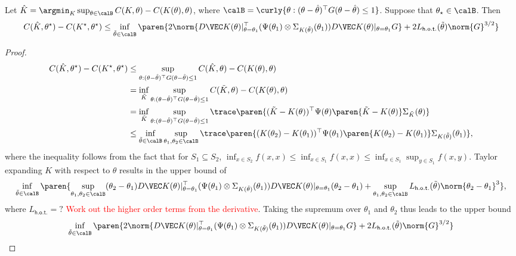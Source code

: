 \begin{lemma}
    Let $\hat K = \argmin_K \sup_{\theta\in\calB} C(K,  \theta) - C(K(\theta), \theta)$, where $\calB = \curly{\theta: (\theta - \hat\theta)^\top G (\theta - \hat \theta) \leq 1}$.  Suppose that $\theta_\star \in \calB$. Then
    \begin{align*}
        C(\hat K, \theta^\star) - C(K^\star, \theta^\star) \leq \inf_{\tilde \theta \in \calB} \paren{ 2 \norm{D \VEC K(\theta)\vert_{\theta= \theta_1}^\top (\Psi(\theta_1) \otimes \Sigma_{K(\tilde \theta)}(\theta_1)) D \VEC K(\theta)\vert_{\theta= \theta_1} G} + 2 L_{\mathsf{h.o.t.}}(\tilde \theta) \norm{G}^{3/2}}
    \end{align*}
\end{lemma}
\begin{proof}
    \begin{align*}
        C(\hat K, \theta^\star) - C(K^\star, \theta^\star)  &\leq \sup_{\theta: (\theta - \hat \theta)^\top G (\theta - \hat\theta) \leq 1} C(\hat K, \theta) - C(K(\theta), \theta) \\
        & = \inf_{\tilde K} \sup_{\theta: (\theta - \hat \theta)^\top G (\theta - \hat\theta) \leq 1} C(\tilde K, \theta) - C(K(\theta), \theta) \\
        &= \inf_{\tilde K} \sup_{\theta: (\theta - \hat \theta)^\top G (\theta - \hat\theta) \leq 1} \trace\paren{(\tilde K - K(\theta))^\top \Psi(\theta) \paren{\tilde K - K(\theta)} \Sigma_{\tilde K}(\theta)} \\
        &\leq \inf_{\tilde \theta \in \calB} \sup_{\theta_1, \theta_2\in\calB} \trace\paren{(K(\theta_2) - K(\theta_1))^\top \Psi(\theta_1) \paren{K(\theta_2) - K(\theta_1)} \Sigma_{K(\tilde \theta)}(\theta_1)},
    \end{align*}
    where the inequality follows from the fact that for $S_1 \subseteq S_2$, $\inf_{x \in S_2} f(x,x) \leq \inf_{x \in S_1} f(x,x) \leq \inf_{x \in S_1} \sup_{y\in S_1} f(x,y)$. Taylor expanding $K$ with respect to $\theta$ results in the upper bound of 
    \begin{align*}
        \inf_{\tilde \theta \in \calB} \paren{\sup_{\theta_1, \theta_2\in\calB} (\theta_2 - \theta_1) D \VEC K(\theta)\vert_{\theta= \theta_1}^\top (\Psi(\theta_1) \otimes \Sigma_{K(\tilde \theta)}(\theta_1)) D \VEC K(\theta)\vert_{\theta= \theta_1} (\theta_2 - \theta_1) + \sup_{\theta_1, \theta_2\in\calB}  L_{\mathsf{h.o.t.}} (\tilde \theta) \norm{\theta_2 - \theta_1}^3},
    \end{align*}
    where $L_{\mathsf{h.o.t.}} = ?$ \textcolor{red}{Work out the higher order terms from the derivative}. Taking the supremum over $\theta_1$ and $\theta_2$ thus leads to the upper bound
    \begin{align*}
         \inf_{\tilde \theta \in \calB} \paren{ 2 \norm{D \VEC K(\theta)\vert_{\theta= \theta_1}^\top (\Psi(\theta_1) \otimes \Sigma_{K(\tilde \theta)}(\theta_1)) D \VEC K(\theta)\vert_{\theta= \theta_1} G} + 2 L_{\mathsf{h.o.t.}}(\tilde \theta) \norm{G}^{3/2}}
    \end{align*}
    

\end{proof}
